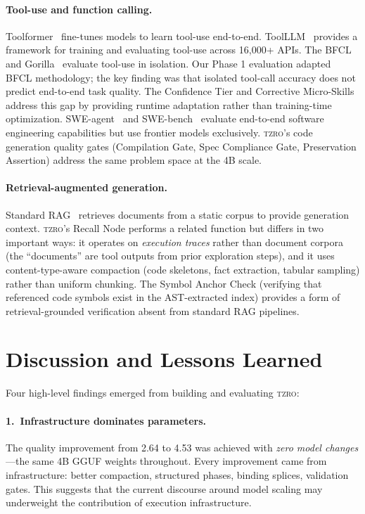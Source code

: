 \documentclass{article}
\begin{document}
\paragraph{Tool-use and function calling.}
Toolformer~\cite{toolformer2023} fine-tunes models to learn tool-use end-to-end.
ToolLLM~\cite{toolllm2023} provides a framework for training and evaluating tool-use across 16,000+ APIs.
The BFCL~\cite{bfcl2024} and Gorilla~\cite{gorilla2023} evaluate tool-use in isolation.
Our Phase 1 evaluation adapted BFCL methodology; the key finding was that isolated tool-call accuracy does not predict end-to-end task quality.
The Confidence Tier and Corrective Micro-Skills address this gap by providing runtime adaptation rather than training-time optimization.
SWE-agent~\cite{sweagent2024} and SWE-bench~\cite{swebench2024} evaluate end-to-end software engineering capabilities but use frontier models exclusively.
\textsc{tzro}'s code generation quality gates (Compilation Gate, Spec Compliance Gate, Preservation Assertion) address the same problem space at the 4B scale.

\paragraph{Retrieval-augmented generation.}
Standard RAG~\cite{rag2020} retrieves documents from a static corpus to provide generation context.
\textsc{tzro}'s Recall Node performs a related function but differs in two important ways: it operates on \emph{execution traces} rather than document corpora (the ``documents'' are tool outputs from prior exploration steps), and it uses content-type-aware compaction (code skeletons, fact extraction, tabular sampling) rather than uniform chunking.
The Symbol Anchor Check (verifying that referenced code symbols exist in the AST-extracted index) provides a form of retrieval-grounded verification absent from standard RAG pipelines.

\section{Discussion and Lessons Learned}
\label{sec:discussion}

Four high-level findings emerged from building and evaluating \textsc{tzro}:

\paragraph{1.\ Infrastructure dominates parameters.}
The quality improvement from 2.64 to 4.53 was achieved with \emph{zero model changes}---the same 4B GGUF weights throughout.
Every improvement came from infrastructure: better compaction, structured phases, binding splices, validation gates.
This suggests that the current discourse around model scaling may underweight the contribution of execution infrastructure.
\end{document}
